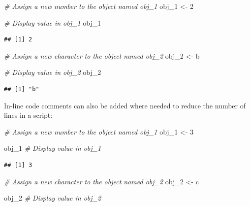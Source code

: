 \documentclass[
]{book}
\newenvironment{Shaded}{\begin{snugshade}}{\end{snugshade}}
\newcommand{\CommentTok}[1]{\textcolor[rgb]{0.56,0.35,0.01}{\textit{#1}}}
\newcommand{\DecValTok}[1]{\textcolor[rgb]{0.00,0.00,0.81}{#1}}
\newcommand{\NormalTok}[1]{#1}
\newcommand{\OtherTok}[1]{\textcolor[rgb]{0.56,0.35,0.01}{#1}}
\newcommand{\StringTok}[1]{\textcolor[rgb]{0.31,0.60,0.02}{#1}}
\begin{document}
\begin{Shaded}
\begin{Highlighting}[]
\CommentTok{\# Assign a new number to the object named obj\_1}
\NormalTok{obj\_1 }\OtherTok{\textless{}{-}} \DecValTok{2}

\CommentTok{\# Display value in obj\_1}
\NormalTok{obj\_1}
\end{Highlighting}
\end{Shaded}

\begin{verbatim}
## [1] 2
\end{verbatim}

\begin{Shaded}
\begin{Highlighting}[]
\CommentTok{\# Assign a new character to the object named obj\_2}
\NormalTok{obj\_2 }\OtherTok{\textless{}{-}} \StringTok{\textquotesingle{}b\textquotesingle{}}

\CommentTok{\# Display value in obj\_2}
\NormalTok{obj\_2}
\end{Highlighting}
\end{Shaded}

\begin{verbatim}
## [1] "b"
\end{verbatim}

In-line code comments can also be added where needed to reduce the number of lines in a script:

\begin{Shaded}
\begin{Highlighting}[]
\CommentTok{\# Assign a new number to the object named obj\_1}
\NormalTok{obj\_1 }\OtherTok{\textless{}{-}} \DecValTok{3}

\NormalTok{obj\_1 }\CommentTok{\# Display value in obj\_1}
\end{Highlighting}
\end{Shaded}

\begin{verbatim}
## [1] 3
\end{verbatim}

\begin{Shaded}
\begin{Highlighting}[]
\CommentTok{\# Assign a new character to the object named obj\_2}
\NormalTok{obj\_2 }\OtherTok{\textless{}{-}} \StringTok{\textquotesingle{}c\textquotesingle{}} 

\NormalTok{obj\_2 }\CommentTok{\# Display value in obj\_2}
\end{Highlighting}
\end{Shaded}
\end{document}
